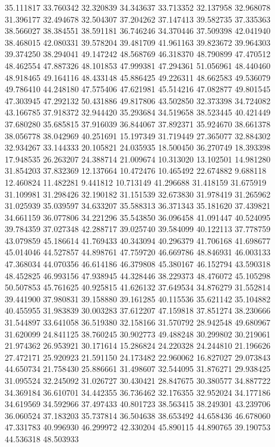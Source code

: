 35.111817
33.760342
32.320839
34.343637
33.713352
32.137958
32.968078
31.396177
32.494678
32.504307
37.204262
37.147413
39.582735
37.335363
38.566027
38.384551
38.591181
36.746246
34.370446
37.509398
42.041940
38.468015
42.080331
39.578204
39.481709
41.961163
39.823672
39.964303
39.374250
38.294041
49.147242
48.568769
46.318370
48.790899
47.470512
48.462554
47.887326
48.101853
47.999381
47.294361
51.056961
48.440460
48.918465
49.164116
48.433148
45.886425
49.226311
48.662583
49.536079
49.786410
44.248180
47.575406
47.621981
45.514216
47.082877
49.801545
47.303945
47.292132
50.431886
49.817806
43.502850
32.373398
34.724082
43.166785
37.918372
32.944420
35.293684
34.519658
38.523445
40.421449
37.680280
35.685815
37.916039
36.844067
37.892371
35.924670
38.661378
38.056778
38.042969
40.251691
15.197349
31.719449
27.365077
32.884302
32.934267
33.144333
20.105821
24.035935
18.500450
36.270749
18.393398
17.948535
26.263207
24.388714
21.009674
10.313020
13.102501
14.981280
31.854203
37.832369
12.137664
10.472476
10.465492
22.674882
9.688118
12.460824
11.482281
9.441812
10.713149
41.296688
31.418159
31.675919
31.109981
31.298426
32.190182
31.151539
32.673830
31.978419
31.265962
31.025939
35.039597
34.633207
35.588313
36.371343
35.181620
37.439821
34.661159
36.077806
34.221296
35.543850
36.096458
41.091447
40.524095
39.784359
37.027348
42.288717
39.025740
39.584099
40.122113
37.778759
43.079859
45.186614
41.769433
40.343094
40.296379
41.706168
41.698677
45.014046
44.527857
44.898761
47.759720
46.669786
48.846931
46.003133
47.368034
44.070356
46.614186
46.379808
45.380167
46.152794
43.590318
48.452825
46.993156
47.938945
44.328446
38.229373
48.476072
45.105298
50.507853
45.761625
40.925815
41.626132
37.649534
34.876279
31.552814
39.441900
37.980831
39.158880
39.161285
40.115536
35.621142
35.104882
40.455955
31.983839
30.003283
37.612207
47.159818
37.851274
38.230666
31.544897
33.641058
36.519380
32.158166
31.570792
28.942548
49.680967
31.620099
24.841125
38.760245
30.902773
49.488248
30.299802
30.219061
21.974362
26.953921
30.171614
15.286824
24.220328
24.244810
21.196626
27.472171
25.920923
21.591150
24.173482
22.960062
16.827027
29.073843
44.650734
21.758430
25.886661
31.498607
32.544095
31.876271
29.938425
31.095524
32.245092
31.026727
30.430421
28.847675
30.380577
34.887722
34.369184
36.610701
34.442355
36.736462
32.176355
32.952024
34.177186
34.619569
34.592966
37.497433
40.801723
38.563415
38.249301
43.239706
36.060524
37.183203
35.737814
36.504638
38.653492
44.658436
46.678060
47.331783
40.996930
46.299972
42.330204
45.890115
44.890765
39.190753
44.536318
48.503933
